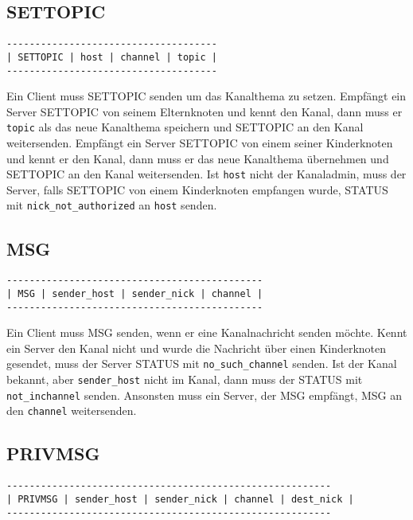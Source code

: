 \documentclass{article}
\begin{document}
\subsection{SETTOPIC}

\begin{lstlisting}
-------------------------------------
| SETTOPIC | host | channel | topic |
-------------------------------------
\end{lstlisting}

Ein Client muss SETTOPIC senden um das Kanalthema zu setzen.
Empfängt ein Server SETTOPIC von seinem Elternknoten und kennt den Kanal, dann muss er \lstinline{topic} als das neue Kanalthema speichern und SETTOPIC an den Kanal weitersenden.
Empfängt ein Server SETTOPIC von einem seiner Kinderknoten und kennt er den Kanal, dann muss er das neue Kanalthema übernehmen und SETTOPIC an den Kanal weitersenden.
Ist \lstinline{host} nicht der Kanaladmin, muss der Server, falls SETTOPIC von einem Kinderknoten empfangen wurde, STATUS mit \lstinline{nick_not_authorized} an \lstinline{host} senden.

\subsection{MSG}

\begin{lstlisting}
---------------------------------------------
| MSG | sender_host | sender_nick | channel |
---------------------------------------------
\end{lstlisting}

Ein Client muss MSG senden, wenn er eine Kanalnachricht senden möchte.
Kennt ein Server den Kanal nicht und wurde die Nachricht über einen Kinderknoten gesendet, muss der Server STATUS mit \lstinline{no_such_channel} senden.
Ist der Kanal bekannt, aber \lstinline{sender_host} nicht im Kanal, dann muss der STATUS mit \lstinline{not_inchannel} senden.
Ansonsten muss ein Server, der MSG empfängt, MSG an den \lstinline{channel} weitersenden.

\subsection{PRIVMSG}

\begin{lstlisting}
---------------------------------------------------------
| PRIVMSG | sender_host | sender_nick | channel | dest_nick |
---------------------------------------------------------
\end{lstlisting}
\end{document}
